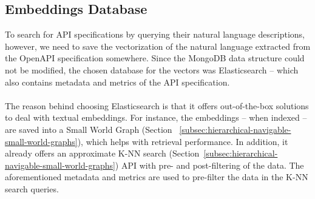 \subsection{Embeddings Database}\label{subsec:embeddings-database}
To search for API specifications by querying their natural language descriptions, however, we need to save the vectorization of the natural language extracted from the OpenAPI specification somewhere.
Since the MongoDB data structure could not be modified, the chosen database for the vectors was Elasticsearch -- which also contains metadata and metrics of the API specification. \\ \\
The reason behind choosing Elasticsearch is that it offers out-of-the-box solutions to deal with textual embeddings.
For instance, the embeddings -- when indexed -- are saved into a Small World Graph (Section ~\ref{subsec:hierarchical-navigable-small-world-graphs}), which helps with retrieval performance.
In addition, it already offers an approximate K-NN search (Section~\ref{subsec:hierarchical-navigable-small-world-graphs}) API with pre- and post-filtering of the data.
The aforementioned metadata and metrics are used to pre-filter the data in the K-NN search queries.
